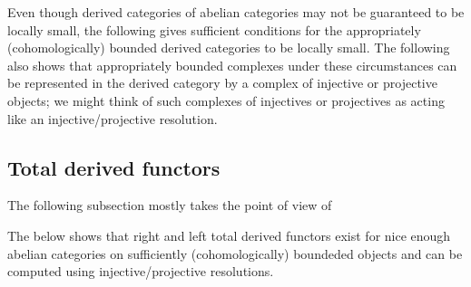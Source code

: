 




Even though derived categories of abelian categories may not be guaranteed to be locally small, the following gives sufficient conditions for the appropriately (cohomologically) bounded derived categories to be locally small. The following also shows that appropriately bounded complexes under these circumstances can be represented in the derived category by a complex of injective or projective objects; we might think of such complexes of injectives or projectives as acting like an injective/projective resolution.






\subsection{Total derived functors }

The following subsection mostly takes the point of view of \cite[Chapter 10]{weibel}





The below shows that right and left total derived functors exist for nice enough abelian categories on sufficiently (cohomologically) boundeded objects and can be computed using injective/projective resolutions.









